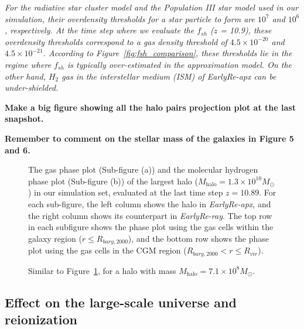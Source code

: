 \documentclass[linenumbers, twocolumn]{aastex631}
\begin{document}
\textit{For the radiative star cluster model and the Population III star model used in our simulation, their overdensity thresholds for a star particle to form are $10^{7}$ and $10^{6}$, respectively. At the time step where we evaluate the $f_{sh}$ ($z$ = 10.9), these overdensity thresholds correspond to a gas density threshold of $4.5\times 10^{-20}$ and $4.5\times 10^{-21}$. According to Figure~\ref{fig:fsh_comparison}, these thresholds lie in the regime where $f_{sh}$ is typically over-estimated in the approximation model. On the other hand, $H_{2}$ gas in the interstellar medium (ISM) of \textit{EarlyRe-apx} can be under-shielded.} 


\textbf{Make a big figure showing all the halo pairs projection plot at the last snapshot.}

\textbf{Remember to comment on the stellar mass of the galaxies in Figure 5 and 6.}

\begin{figure}
    \caption{The gas phase plot (Sub-figure (a)) and the molecular hydrogen phase plot (Sub-figure (b)) of the largest halo ($M_{\mathrm{halo}} = 1.3\times10^{10} M_\odot$) in our simulation set, evaluated at the last time step $z = 10.89$. For each sub-figure, the left column shows the halo in \textit{EarlyRe-apx}, and the right column shows its counterpart in \textit{EarlyRe-ray}. The top row in each subfigure shows the phase plot using the gas cells within the galaxy region ($r \leq R_{bary,2000}$), and the bottom row shows the phase plot using the gas cells in the CGM region ($R_{bary,2000} < r \leq R_{vir}$).} 
    \label{fig:phaseplot_Halo0-0}
\end{figure}

\begin{figure}
    \caption{Similar to Figure~\ref{fig:phaseplot_Halo0-0}, for a halo with mass $M_{\mathrm{halo}} = 7.1\times 10^{8} M_\odot$.}
    \label{fig:phaseplot_Halo18-19}
\end{figure}


\subsection{Effect on the large-scale universe and reionization}
\end{document}

